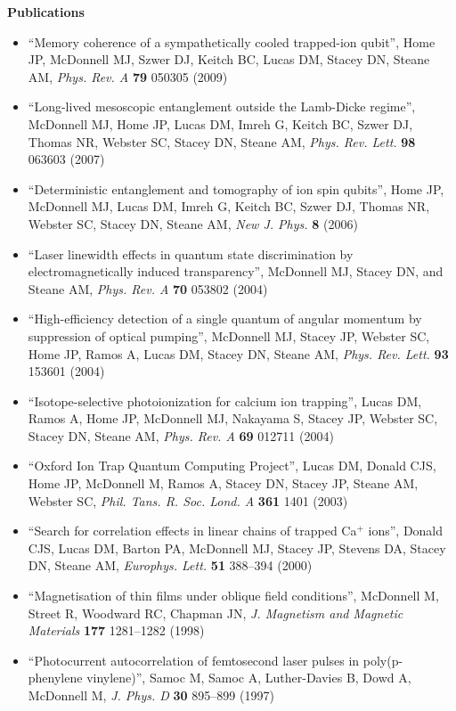 \documentclass[11pt,a4paper]{article}
\begin{document}
%
{\large \textbf{Publications}}
\begin{itemize}
  \item ``Memory coherence of a sympathetically cooled trapped-ion
    qubit'', Home JP, McDonnell MJ, Szwer DJ, Keitch BC, Lucas DM, Stacey DN,
    Steane AM, \textit{Phys. Rev. A} \textbf{79} 050305 (2009)
  \item ``Long-lived mesoscopic entanglement outside the Lamb-Dicke
    regime'', McDonnell MJ, Home JP, Lucas DM, Imreh G, Keitch BC, Szwer DJ,
    Thomas NR, Webster SC, Stacey DN, Steane AM, \textit{Phys. Rev. Lett.}
    \textbf{98} 063603 (2007)
  \item ``Deterministic entanglement and tomography of ion spin qubits'',
    Home JP, McDonnell MJ, Lucas DM, Imreh G, Keitch BC, Szwer DJ, Thomas NR,
    Webster SC, Stacey DN, Steane AM, \textit{New J. Phys.} \textbf{8} (2006)
  \item ``Laser linewidth effects in quantum state discrimination by
    electromagnetically induced transparency'',  McDonnell MJ,
    Stacey DN, and Steane AM, \textit{Phys. Rev. A} \textbf{70}
    053802 (2004) 
  \item ``High-efficiency detection of a single quantum of angular
    momentum by suppression of optical pumping'',  McDonnell MJ,
    Stacey JP, Webster SC, Home JP, Ramos A, Lucas DM, Stacey DN,
    Steane AM, 
    \textit{Phys. Rev. Lett.} \textbf{93} 153601 (2004)
  \item ``Isotope-selective photoionization for calcium ion
    trapping'', Lucas DM, Ramos A, Home JP, McDonnell MJ, Nakayama S,
    Stacey JP, Webster SC, Stacey DN, Steane AM,
    \textit{Phys. Rev. A} \textbf{69} 012711 (2004)
  \item ``Oxford Ion Trap Quantum Computing Project'', Lucas DM, Donald CJS,
    Home JP, McDonnell M, Ramos A, Stacey DN, Stacey JP, Steane AM,
    Webster SC, \textit{Phil. Tans. R. Soc. Lond. A} \textbf{361} 1401
    (2003)
  \item ``Search for correlation effects in linear chains of trapped
    Ca$^{+}$ ions'', Donald CJS, Lucas DM, Barton PA, McDonnell MJ,
    Stacey JP, Stevens DA, Stacey DN, Steane AM,
    \textit{Europhys. Lett.} \textbf{51} 388--394 (2000)
  \item ``Magnetisation of thin films under oblique field
    conditions'', McDonnell M, Street R, Woodward RC, Chapman JN,
    \textit{J. Magnetism and Magnetic Materials} \textbf{177}
    1281--1282 (1998)
  \item ``Photocurrent autocorrelation of femtosecond laser pulses in
    poly(p-phenylene vinylene)'', Samoc M, Samoc A, Luther-Davies B,
    Dowd A, McDonnell M, \textit{J. Phys. D} \textbf{30} 895--899 (1997)
\end{itemize}
\end{document}

